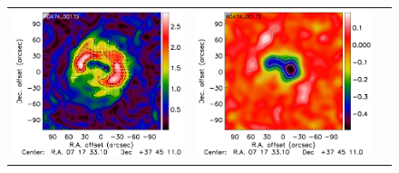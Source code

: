 \documentclass[twocolumn,traditabstract]{aa}
\begin{document}
\begin{figure}[h]
{\begin{tabular}{lll}
\includegraphics[trim=2.3cm 2.2cm 0cm 0cm, clip=true, scale=1]{Figure/Grad_RG474_00172_Ymap_zobs0p9_processed_15_15_45.pdf} & 
\includegraphics[trim=2.3cm 2.2cm 0cm 0cm, clip=true, scale=1]{Figure/DoG_RG474_00172_Ymap_zobs0p9_processed_15_15_45.pdf} \\

\end{tabular}}
\end{figure}
\end{document}
